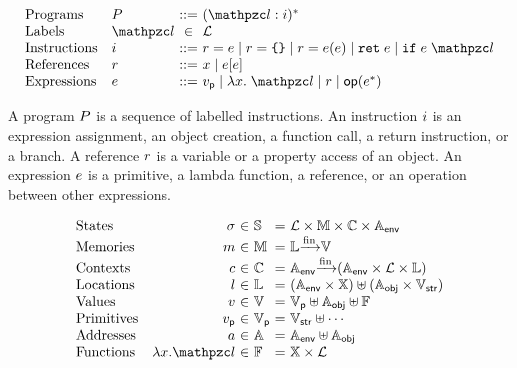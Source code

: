 \[
  \begin{array}{ll@{~}c@{~}l}
    \text{Programs} & \prog &::=& (\lab: \inst)^*\\

    \text{Labels} & \lab &\in& \labset\\

    \text{Instructions} & \inst &::=&
    \refer = \expr \mid
    \refer = \kwobj \mid
    \refer = \expr ( \expr ) \mid
    \kwret \; \expr \mid
    \kwif \; \expr \; \lab\\

    \text{References} & \refer &::=&
    x \mid
    \expr [ \expr ]\\

    \text{Expressions} & \expr &::=&
    \pval \mid
    \lambda x. \; \lab \mid
    \refer \mid
    \op(\expr^*)\\
  \end{array}
\]

A program $P$ is a sequence of labelled instructions. An instruction $i$
is an expression assignment, an object creation, a function call, a return
instruction, or a branch.  A reference $r$ is a variable or a property
access of an object.  An expression $e$ is a primitive, a lambda function, a
reference, or an operation between other expressions.

\[
  \begin{array}{lr@{~}c@{~}l@{~}c@{~}l}
    \text{States} & \st &\in& \stset &=& \labset \times \memset \times
    \ctxtset \times \eaddrset\\
    \text{Memories} & \mem &\in& \memset &=& \locset \finmap \valset\\
    \text{Contexts} & \ctxt &\in& \ctxtset &=& \eaddrset \finmap (\eaddrset
    \times \labset \times \locset)\\
    \text{Locations} & \loc &\in& \locset &=& (\eaddrset \times \varset) \uplus
    (\oaddrset \times \strset)\\
    \text{Values} & \val &\in& \valset &=& \pvalset \uplus \oaddrset \uplus
    \fvalset\\
    \text{Primitives} & \pval &\in& \pvalset &=& \strset \uplus \cdots\\
    \text{Addresses} & \addr &\in& \addrset &=& \eaddrset \uplus \oaddrset\\
    \text{Functions} & \fval{x}{\lab} &\in& \fvalset &=& \varset \times
    \labset\\
  \end{array}
\]

